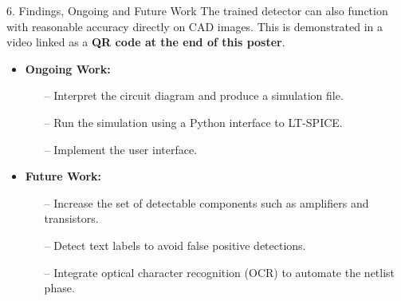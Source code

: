 \documentclass{beamer}
\begin{document}
\begin{frame}[t]
\begin{columns}[t]
\begin{column}{\colwidth}
\begin{block}{6. Findings, Ongoing and Future Work}
        The trained detector can also function with reasonable accuracy directly on CAD images.
        This is demonstrated in a video linked as a \textbf{QR code at the end of this poster}.

        \begin{itemize}
          \item \textbf{Ongoing Work:}
                \begin{itemize}
                  \normalsize
                  \item[--] Interpret the circuit diagram and produce a simulation file.
                  \item[--] Run the simulation using a Python interface to LT-SPICE.
                  \item[--] Implement the user interface.
                \end{itemize}
          \item \textbf{Future Work:}
                \normalsize
                \begin{itemize}
                  \normalsize
                  \item[--] Increase the set of detectable components such as amplifiers and transistors.
                  \item[--] Detect text labels to avoid false positive detections.
                  \item[--] Integrate optical character recognition (OCR) to automate the netlist phase.
                \end{itemize}
        \end{itemize}
      \end{block}
      
      \vspace*{-2.5ex}

      {\beamerblocknoheader
      \begin{block}{}
        \footnotesize
        
        
      \end{block}
      }

    \end{column}

    \separatorcolumn

  \end{columns}

\end{frame}
\end{document}
